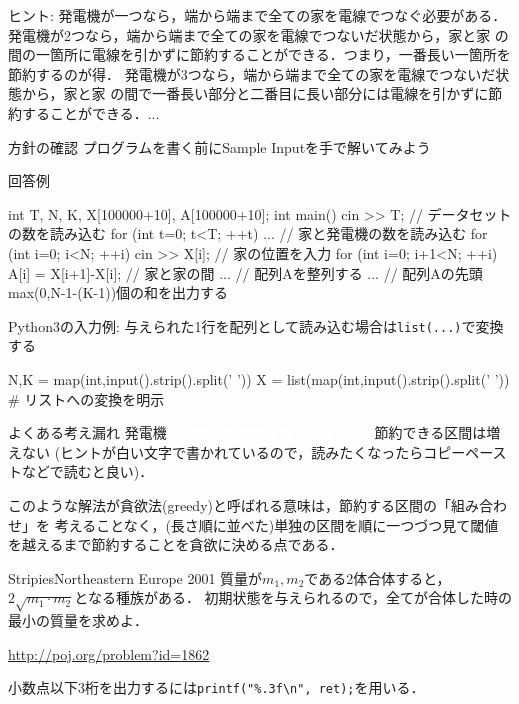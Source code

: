 ヒント: 発電機が一つなら，端から端まで全ての家を電線でつなぐ必要がある．
発電機が2つなら，端から端まで全ての家を電線でつないだ状態から，家と家
の間の一箇所に電線を引かずに節約することができる．つまり，一番長い一箇所を節約するのが得．
発電機が3つなら，端から端まで全ての家を電線でつないだ状態から，家と家
の間で一番長い部分と二番目に長い部分には電線を引かずに節約することができる．...

\begin{tipsbox}{方針の確認}
プログラムを書く前にSample Inputを手で解いてみよう
\end{tipsbox}


回答例
\begin{cbox}
int T, N, K, X[100000+10], A[100000+10];
int main() {
    cin >> T; // データセットの数を読み込む
    for (int t=0; t<T; ++t) {
        ... // 家と発電機の数を読み込む
        for (int i=0; i<N; ++i) cin >> X[i]; // 家の位置を入力
        for (int i=0; i+1<N; ++i) A[i] = X[i+1]-X[i]; // 家と家の間
        ... // 配列Aを整列する
        ... // 配列Aの先頭max(0,N-1-(K-1))個の和を出力する
    }
}
\end{cbox}

Python3の入力例: 与えられた1行を配列として読み込む場合は\texttt{list(...)}で変換する
\begin{pybox}
N,K = map(int,input().strip().split(' '))
X = list(map(int,input().strip().split(' ')) # リストへの変換を明示
\end{pybox}

\begin{debugbox}{よくある考え漏れ}
発電機\textcolor{white}{の個数が家の数を越えて増えても}節約できる区間は増えない (ヒントが白い文字で書かれているので，読みたくなったらコピーペーストなどで読むと良い)．
\end{debugbox}

このような解法が貪欲法(greedy)と呼ばれる意味は，節約する区間の「組み合わせ」を
考えることなく，(長さ順に並べた)単独の区間を順に一つづつ見て閾値を越えるまで節約することを貪欲に決める点である．

\begin{pbox}{Stripies}{Northeastern Europe 2001}
質量が$m_1,m_2$である2体合体すると，$2\sqrt{m_1\cdot m_2}$となる種族がある．
初期状態を与えられるので，全てが合体した時の最小の質量を求めよ．

\url{http://poj.org/problem?id=1862}
\end{pbox}

小数点以下3桁を出力するには\texttt{printf("\%.3f\textbackslash{}n", ret);}を用いる．

